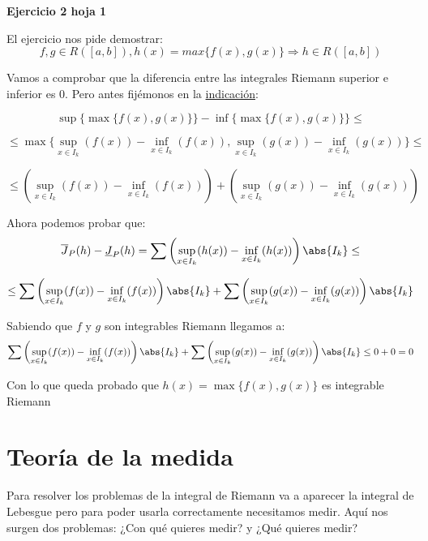 \documentclass{apuntes}
\begin{document}
\begin{example}
\textbf{Ejercicio 2 hoja 1}

El ejercicio nos pide demostrar:
\[ f,g \in R([a,b]), h(x) = max\lbrace f(x), g(x) \rbrace \Rightarrow h \in R([a,b]) \]

Vamos a comprobar que la diferencia entre las integrales Riemann superior e inferior es 0.
Pero antes fijémonos en la \underline{indicación}:

\newpage
\[\sup\big\{ \max\{f(x), g(x)\}\big\} - \inf\big\{ \max\{f(x), g(x)\} \big\} \leq \]

\[ \leq \max\big\{ \sup_{x \in I_k} (f(x)) - \inf_{x \in I_k} (f(x)), \sup_{x \in I_k} (g(x)) - \inf_{x \in I_k} (g(x)) \big\} \leq \]

\[ \leq \left(\sup_{x \in I_k} (f(x)) - \inf_{x \in I_k} (f(x))\right) + \left(\sup_{x \in I_k} (g(x)) - \inf_{x \in I_k} (g(x))\right) \]


Ahora podemos probar que:
\[\overline{J}_P(h)-\underline{J}_P(h)
= \sum\left(\sup_{x\in I_k}(h(x))-\inf_{x\in I_k}(h(x))\right)\abs{I_k} \leq\]


\[\leq \sum\left( \sup_{x \in I_k} (f(x)) - \inf_{x \in I_k} (f(x)) \right) \abs{I_k} +
 \sum\left( \sup_{x \in I_k} (g(x)) - \inf_{x \in I_k} (g(x)) \right) \abs{I_k} \]

Sabiendo que $f$ y $g$ son integrables Riemann llegamos a:
\[\sum\left( \sup_{x \in I_k} (f(x)) - \inf_{x \in I_k} (f(x)) \right) \abs{I_k} +
 \sum\left( \sup_{x \in I_k} (g(x)) - \inf_{x \in I_k} (g(x)) \right) \abs{I_k} \leq 0 + 0 = 0\]

 Con lo que queda probado que $h(x) = \max\lbrace f(x), g(x) \rbrace$ es integrable Riemann

\end{example}

\chapter{Teoría de la medida}
Para resolver los problemas de la integral de Riemann va a aparecer la integral de Lebesgue pero para poder usarla correctamente necesitamos medir. Aquí nos surgen dos problemas: ¿Con qué quieres medir? y ¿Qué quieres medir?
\end{document}
